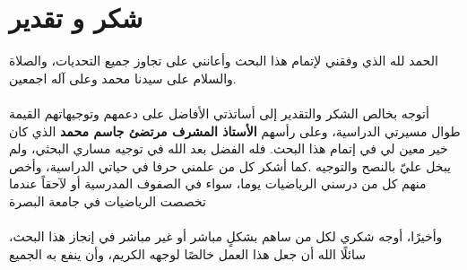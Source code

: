 \chapter*{شكر و تقدير}
الحمد لله الذي وفقني لإتمام هذا البحث وأعانني على تجاوز جميع التحديات، والصلاة والسلام على سيدنا محمد وعلى آله اجمعين.\\ \\ 
أتوجه بخالص الشكر والتقدير إلى أساتذتي الأفاضل على دعمهم وتوجيهاتهم القيمة طوال مسيرتي الدراسية، وعلى رأسهم \textbf{الأستاذ المشرف مرتضئ جاسم محمد }الذي كان خير معين لي في إتمام هذا البحث. فله الفضل بعد الله في توجيه مساري البحثي، ولم يبخل عليّ بالنصح والتوجيه .كما أشكر كل من علمني حرفا في حياتي الدراسية، وأخص منهم كل من درسني الرياضيات يوما، سواء في الصفوف المدرسية أو لآحقاً عندما تخصصت الرياضيات في جامعة البصرة\\ \\ 
وأخيرًا، أوجه شكري لكل من ساهم بشكلٍ مباشر أو غير مباشر في إنجاز هذا البحث، سائلًا الله أن جعل هذا العمل خالصًا لوجهه الكريم، وأن ينفع به الجميع